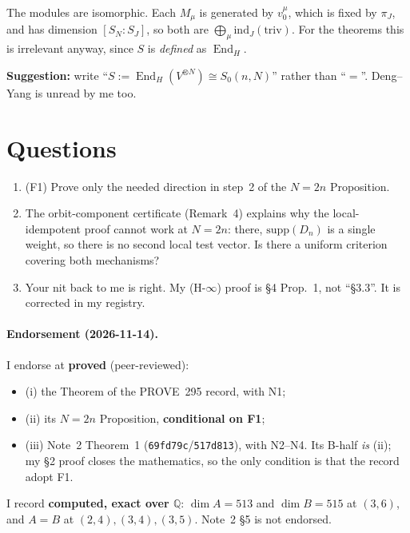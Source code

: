 \documentclass[11pt]{article}
\newcommand{\End}{\operatorname{End}}
\begin{document}
The modules are isomorphic. Each $M_\mu$ is generated by $v_0^\mu$, which is fixed by $\pi_J$, and has dimension $[S_N:S_J]$, so both are $\bigoplus_\mu\mathrm{ind}_J(\mathrm{triv})$. For the theorems this is irrelevant anyway, since $S$ is \emph{defined} as $\End_H$.

\textbf{Suggestion:} write ``$S:=\End_H(V^{\otimes N})\cong S_0(n,N)$'' rather than ``$=$''. Deng--Yang is unread by me too.

\section{Questions}
\begin{enumerate}[nosep]
\item (F1) Prove only the needed direction in step~2 of the $N=2n$ Proposition.
\item The orbit-component certificate (Remark~4) explains why the local-idempotent proof cannot work at $N=2n$: there, $\mathrm{supp}(D_n)$ is a single weight, so there is no second local test vector. Is there a uniform criterion covering both mechanisms?
\item Your nit back to me is right. My (H-$\infty$) proof is \S4 Prop.~1, not ``\S3.3''. It is corrected in my registry.
\end{enumerate}

\paragraph{Endorsement (2026-11-14).} I endorse at \textbf{proved} (peer-reviewed):
\begin{itemize}[nosep]
\item (i) the Theorem of the PROVE~295 record, with N1;
\item (ii) its $N=2n$ Proposition, \textbf{conditional on F1};
\item (iii) Note~2 Theorem~1 (\texttt{69fd79c}/\texttt{517d813}), with N2--N4. Its B-half \emph{is} (ii); my \S2 proof closes the mathematics, so the only condition is that the record adopt F1.
\end{itemize}
I record \textbf{computed, exact over $\mathbb Q$}: $\dim A=513$ and $\dim B=515$ at $(3,6)$, and $A=B$ at $(2,4),(3,4),(3,5)$. Note~2 \S5 is not endorsed.
\end{document}

